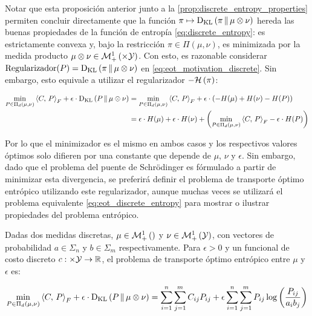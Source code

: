 Notar que esta proposición anterior junto a la \autoref{prop:discrete_entropy_properties} permiten concluir directamente que la función $\pi\mapsto\operatorname{D_{KL}}\left(\pi\,\|\,\mu\otimes\nu\right)$ hereda las buenas propiedades de la función de entropía \eqref{eq:discrete_entropy}: es estrictamente convexa y, bajo la restricción $\pi\in\Pi(\mu,\nu)$, es minimizada por la medida producto $\mu\otimes\nu\in\probmeasure{\xspace\times\yspace}$. Con esto, es razonable considerar $\text{Regularizador}(P)=\operatorname{D_{KL}}\left(\pi\,\|\,\mu\otimes\nu\right)$ en \eqref{eq:eot_motivation_discrete}. Sin embargo, esto equivale a utilizar el regularizador $-\mathcal{H}\left(\pi\right)$:

\begin{align}
	\min_{P\in\Pi_d(\mu,\nu)} \left\langle C,\,P\right\rangle_F + \epsilon \cdot\operatorname{D_{KL}}\left(P\,\|\,\mu\otimes\nu\right)
	 & = \min_{P\in\Pi_d(\mu,\nu)}  \left\langle C,\,P\right\rangle_F + \epsilon\cdot\left(-H(\mu) + H(\nu) - H(P)\right)                             \\
	 & = \epsilon\cdot H(\mu) + \epsilon\cdot H(\nu) + \left(\min_{P\in\Pi_d(\mu,\nu)}  \left\langle C,\,P\right\rangle_F - \epsilon\cdot H(P)\right)
\end{align}

Por lo que el minimizador es el mismo en ambos casos y los respectivos valores óptimos solo difieren por una constante que depende de $\mu$, $\nu$ y $\epsilon$. Sin embargo, dado que el problema del puente de Schrödinger es fórmulado a partir de minimizar esta divergencia, se preferirá definir el problema de transporte óptimo entrópico utilizando este regularizador, aunque muchas veces se utilizará el problema equivalente \eqref{eq:eot_discrete_entropy} para mostrar o ilustrar propiedades del problema entrópico.

\begin{defn}
	\label{defn:eot_discrete}
	Dadas dos medidas discretas, $\mu\in\mathcal{M}_+^1\left(\right)$ y $\nu\in\mathcal{M}_+^1\left(\mathcal{Y}\right)$, con vectores de probabilidad $a\in\Sigma_n$ y $b\in\Sigma_m$ respectivamente. Para $\epsilon>0$ y un funcional de costo discreto $c:\times\mathcal{Y}\to\mathbb{R}$, el problema de transporte óptimo entrópico entre $\mu$ y $\epsilon$ es:

	\begin{equation}
		\label{eq:eot_discrete_kl}
		\min_{P\in\Pi_d(\mu,\nu)} \left\langle C,\,P\right\rangle_F + \epsilon \cdot\operatorname{D_{KL}}\left(P\,\|\,\mu\otimes\nu\right) =
		\sum_{i=1}^n\sum_{j=1}^m C_{ij}P_{ij} + \epsilon \sum_{i=1}^n\sum_{j=1}^m P_{ij}\log\left(\frac{P_{ij}}{a_ib_j}\right)
	\end{equation}
\end{defn}

